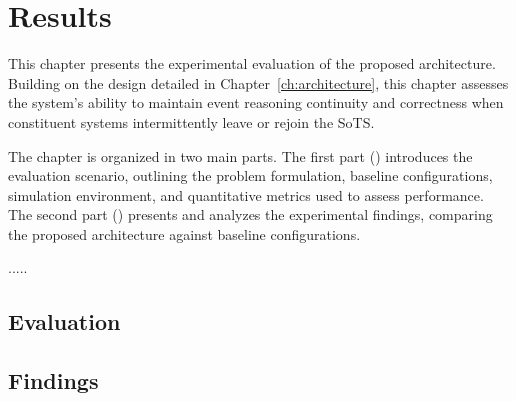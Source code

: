 \chapter{Results}\label{ch:results}
This chapter presents the experimental evaluation of the proposed architecture. Building on the design detailed in Chapter~\ref{ch:architecture}, this chapter assesses the system’s ability to maintain event reasoning continuity and correctness when constituent systems intermittently leave or rejoin the SoTS.  

The chapter is organized in two main parts. The first part () introduces the evaluation scenario, outlining the problem formulation, baseline configurations, simulation environment, and quantitative metrics used to assess performance. The second part () presents and analyzes the experimental findings, comparing the proposed architecture against baseline configurations.

.....

\section{Evaluation}\label{sec:results-eval}

\section{Findings}\label{sec:results-res}


